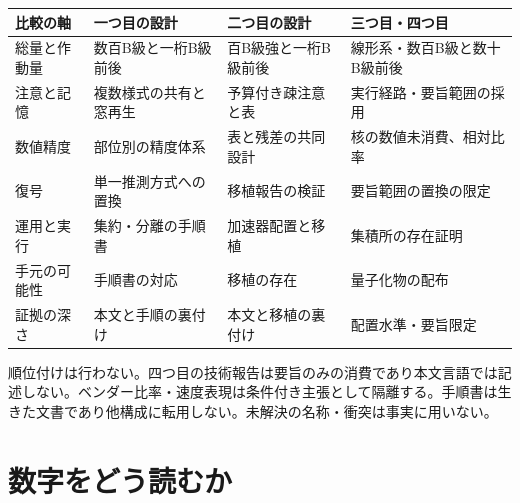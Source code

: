 \documentclass[lualatex,a4paper,10pt]{jlreq}
\begin{document}
\begin{center}
\small
\begin{tabularx}{\textwidth}{@{}p{}p{}p{}X@{}}
\toprule
比較の軸 & 一つ目の設計 & 二つ目の設計 & 三つ目・四つ目 \\
\midrule
総量と作動量 & 数百B級と一桁B級前後 & 百B級強と一桁B級前後 & 線形系・数百B級と数十B級前後 \\
注意と記憶 & 複数様式の共有と窓再生 & 予算付き疎注意と表 & 実行経路・要旨範囲の採用 \\
数値精度 & 部位別の精度体系 & 表と残差の共同設計 & 核の数値未消費、相対比率 \\
復号 & 単一推測方式への置換 & 移植報告の検証 & 要旨範囲の置換の限定 \\
運用と実行 & 集約・分離の手順書 & 加速器配置と移植 & 集積所の存在証明 \\
手元の可能性 & 手順書の対応 & 移植の存在 & 量子化物の配布 \\
証拠の深さ & 本文と手順の裏付け & 本文と移植の裏付け & 配置水準・要旨限定 \\
\bottomrule
\end{tabularx}
\end{center}
\autocite{v41report,qwen38next,kimigithub,glm5report}

\begin{claimboundary}[本節の読解上の境界]
順位付けは行わない。四つ目の技術報告は要旨のみの消費であり本文言語では記述しない。ベンダー比率・速度表現は条件付き主張として隔離する。手順書は生きた文書であり他構成に転用しない。未解決の名称・衝突は事実に用いない。
\end{claimboundary}

\section{数字をどう読むか}
\label{sec:measure}
\end{document}
